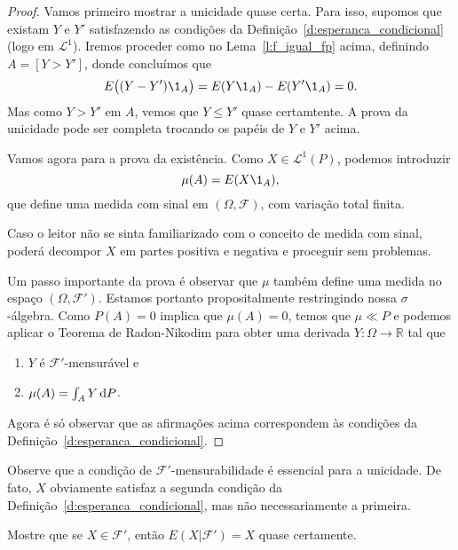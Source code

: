 \begin{proof}
  Vamos primeiro mostrar a unicidade quase certa.
  Para isso, supomos que existam $Y$ e $Y'$ satisfazendo as condições da Definição~\ref{d:esperanca_condicional} (logo em $\mathcal{L}^1$).
  Iremos proceder como no Lema~\ref{l:f_igual_fp} acima, definindo $A = [Y > Y']$, donde concluímos que
  \begin{equation}
    E\big( (Y - Y')\1_{A} \big) = E(Y \1_{A}) - E(Y' \1_{A}) = 0.
  \end{equation}
  Mas como $Y > Y'$ em $A$, vemos que $Y \leq Y'$ quase certamtente.
  A prova da unicidade pode ser completa trocando os papéis de $Y$ e $Y'$ acima.

  Vamos agora para a prova da existência.
  Como $X \in \mathcal{L}^1(P)$, podemos introduzir
  \begin{equation}
    \mu(A) = E(X \1_{A}),
  \end{equation}
  que define uma medida com sinal em $(\Omega, \mathcal{F})$, com variação total finita.

  Caso o leitor não se sinta familiarizado com o conceito de medida com sinal, poderá decompor $X$ em partes positiva e negativa e proceguir sem problemas.

  Um passo importante da prova é observar que $\mu$ também define uma medida no espaço $(\Omega, \mathcal{F}')$.
  Estamos portanto propositalmente restringindo nossa $\sigma$-álgebra.
  Como $P(A) = 0$ implica que $\mu(A) = 0$, temos que $\mu \ll P$ e podemos aplicar o Teorema de Radon-Nikodim para obter uma derivada $Y:\Omega \to \mathbb{R}$ tal que
  \begin{enumerate}[\quad a)]
  \item $Y$ é $\mathcal{F}'$-mensurável e
  \item $\mu(A) = \int_A Y \mathop{}\!\mathrm{d} P$.
  \end{enumerate}
  Agora é só observar que as afirmações acima correspondem às condições da Definição~\ref{d:esperanca_condicional}.
\end{proof}

Observe que a condição de $\mathcal{F}'$-mensurabilidade é essencial para a unicidade.
De fato, $X$ obviamente satisfaz a segunda condição da Definição~\ref{d:esperanca_condicional}, mas não necessariamente a primeira.

\begin{exercise}
  Mostre que se $X \in \mathcal{F}'$, então $E(X|\mathcal{F}') = X$ quase certamente.
\end{exercise}

